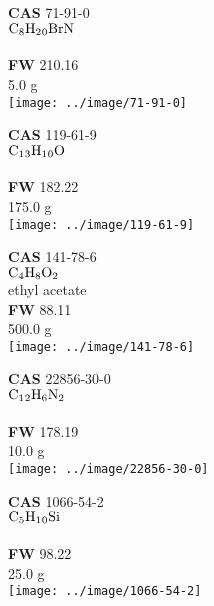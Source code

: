 \item \textbf{CAS }71-91-0\\$\rm C_8{}H_2{}_0{}BrN$\\\\\textbf{FW }210.16\\5.0 g\\{\centering \texttt{[image: ../image/71-91-0]}}
\item \textbf{CAS }119-61-9\\$\rm C_1{}_3{}H_1{}_0{}O$\\ \\\textbf{FW }182.22\\175.0 g\\{\centering \texttt{[image: ../image/119-61-9]}}
\item \textbf{CAS }141-78-6\\$\rm C_4{}H_8{}O_2{}$\\ethyl acetate\\\textbf{FW }88.11\\500.0 g\\{\centering \texttt{[image: ../image/141-78-6]}}
\item \textbf{CAS }22856-30-0\\$\rm C_1{}_2{}H_6{}N_2{}$\\ \\\textbf{FW }178.19\\10.0 g\\{\centering \texttt{[image: ../image/22856-30-0]}}
\item \textbf{CAS }1066-54-2\\$\rm C_5{}H_1{}_0{}Si$\\ \\\textbf{FW }98.22\\25.0 g\\{\centering \texttt{[image: ../image/1066-54-2]}}
